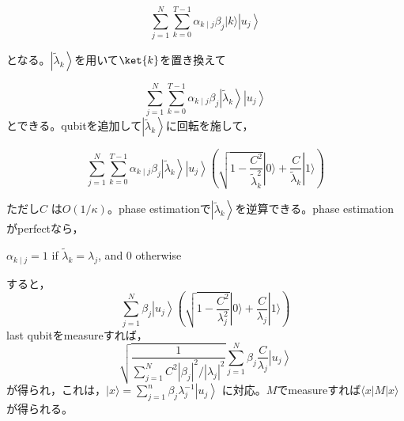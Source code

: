\documentclass[b5paper,papersize,dvipdfmx,fleqn]{jsarticle}
\begin{document}
$$
\sum_{j=1}^{N} \sum_{k=0}^{T-1} \alpha_{k \mid j} \beta_{j}|k\rangle\left|u_{j}\right\rangle
$$

となる。$\left|\tilde{\lambda}_{k}\right\rangle$を用いて$\ket{k}$を置き換えて

$$
\sum_{j=1}^{N} \sum_{k=0}^{T-1} \alpha_{k \mid j} \beta_{j}\left|\tilde{\lambda}_{k}\right\rangle\left|u_{j}\right\rangle
$$
とできる。qubitを追加して$\left|\tilde{\lambda}_{k}\right\rangle$に回転を施して，

$$
\sum_{j=1}^{N} \sum_{k=0}^{T-1} \alpha_{k \mid j} \beta_{j}\left|\tilde{\lambda}_{k}\right\rangle\left|u_{j}\right\rangle\left(\sqrt{1-\frac{C^{2}}{\tilde{\lambda}_{k}^{2}}}|0\rangle+\frac{C}{\tilde{\lambda}_{k}}|1\rangle\right)
$$

ただし$C$ は$O(1 / \kappa)$。phase estimationで$\left|\tilde{\lambda}_{k}\right\rangle $を逆算できる。phase estimation がperfectなら，

$\alpha_{k \mid j}=1$ if $\tilde{\lambda}_{k}=\lambda_{j}$, and 0 otherwise

すると，
$$
\sum_{j=1}^{N} \beta_{j}\left|u_{j}\right\rangle\left(\sqrt{1-\frac{C^{2}}{\lambda_{j}^{2}}}|0\rangle+\frac{C}{\lambda_{j}}|1\rangle\right)
$$
last qubitをmeasureすれば，
$$
\sqrt{\frac{1}{\sum_{j=1}^{N} C^{2}\left|\beta_{j}\right|^{2} /\left|\lambda_{j}\right|^{2}}} \sum_{j=1}^{N} \beta_{j} \frac{C}{\lambda_{j}}\left|u_{j}\right\rangle
$$
が得られ，これは，$|x\rangle=\sum_{j=1}^{n} \beta_{j} \lambda_{j}^{-1}\left|u_{j}\right\rangle$ に対応。$M$でmeasureすれば$\langle x|M| x\rangle$が得られる。
%
%
\end{document}
